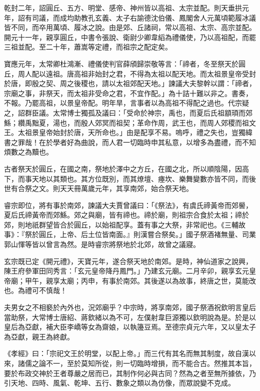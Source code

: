 \begin{pinyinscope}
 乾封二年，詔圓丘、五方、明堂、感帝、神州皆以高祖、太宗並配。則天垂拱元年，詔有司議，而成均助教孔玄義、太子右諭德沈伯儀、鳳閣舍人元萬頃範履冰議皆不同，而卒用萬頃、履冰之說。由是郊、丘諸祠，常以高祖、太宗、高宗並配。開元十一年，親享圓丘，中書令張說、衛尉少卿韋縚為禮儀使，乃以高祖配，而罷三祖並配。至二十年，蕭嵩等定禮，而祖宗之配定矣。



 寶應元年，太常卿杜鴻漸、禮儀使判官薛頎歸崇敬等言：「禘者，冬至祭天於圓丘，周人配以遠祖。唐高祖非始封之君，不得為太祖以配天地。而太祖景皇帝受封於唐，即殷之契、周之後稷也，請以太祖郊配天地。」諫議大夫黎幹以謂：「禘者，宗廟之事，非祭天，而太祖非受命之君，不宜作配。」為十詰十難以非之。書奏，不報。乃罷高祖，以景皇帝配。明年旱，言事者以為高祖不得配之過也。代宗疑之，詔群臣議。太常博士獨孤及議曰：「受命於神宗，禹也，而夏后氏祖顓頊而郊鯀；纘禹黜夏，湯也，而殷人郊冥而祖契；革命作周，武王也，而周人郊稷而祖文王。太祖景皇帝始封於唐，天所命也。」由是配享不易。嗚呼，禮之失也，豈獨緯書之罪哉！在於學者好為曲說，而人君一切臨時申其私意，以增多為盡禮，而不知煩數之為黷也。



 古者祭天於圓丘，在國之南，祭地於澤中之方丘，在國之北，所以順陰陽，因高下，而事天地以其類也。其方位既別，而其燎壇、瘞坎、樂舞變數亦皆不同，而後世有合祭之文。則天天冊萬歲元年，其享南郊，始合祭天地。



 睿宗即位，將有事於南郊，諫議大夫賈曾議曰：「《祭法》，有虞氏禘黃帝而郊嚳，夏后氏禘黃帝而郊鯀。郊之與廟，皆有禘也。禘於廟，則祖宗合食於太祖；禘於郊，則地祇群望皆合於圓丘，以始祖配享。蓋有事之大祭，非常祀也。《三輔故事》：『祭於圓丘，上帝、后土位皆南面。』則漢嘗合祭矣。」國子祭酒褚無量、司業郭山惲等皆以曾言為然。是時睿宗將祭地於北郊，故曾之議寢。



 玄宗既已定《開元禮》，天寶元年，遂合祭天地於南郊。是時，神仙道家之說興，陳王府參軍田同秀言：「玄元皇帝降丹鳳門。」乃建玄元廟。二月辛卯，親享玄元皇帝廟；甲午，親享太廟；丙申，有事於南郊。其後遂以為故事，終唐之世，莫能改也。為禮可不慎哉！



 夫男女之不相褻於內外也，況郊廟乎？中宗時，將享南郊，國子祭酒祝欽明言皇后當助祭，大常博士唐紹、蔣欽緒以為不可，左僕射韋巨源獨以欽明說為是。於是以皇后為亞獻，補大臣李嶠等女為齋娘，以執籩豆焉。至德宗貞元六年，又以皇太子為亞獻，親王為終獻。



 《孝經》曰：「宗祀文王於明堂，以配上帝。」而三代有其名而無其制度，故自漢以來，諸儒之論不一，至於莫知所從，則一切臨時增損，而不能合古。然推其本旨，要於布政交神於王者尊嚴之居而已，其制作何必與古同？然為之者至無所據依，乃引天地、四時、風氣、乾坤、五行、數象之類以為仿像，而眾說變不克成。




\end{pinyinscope}
